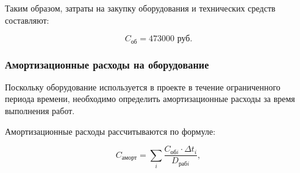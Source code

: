 \begin{table}[h]
\centering
\caption{Затраты на закупку оборудования и технических средств}
\label{tab:equipment}
\end{table}

Таким образом, затраты на закупку оборудования и технических средств
составляют:

\begin{equation}
C_{\text{об}} = 473000 \text{ руб.}
\end{equation}

\subsubsection*{Амортизационные расходы на оборудование}

Поскольку оборудование используется в проекте в течение ограниченного
периода времени, необходимо определить амортизационные расходы за
время выполнения работ.

Амортизационные расходы рассчитываются по формуле:

\begin{equation}
C_{\text{аморт}} =
\sum_i \frac{C_{\text{об}i} \cdot \Delta t_i}{D_{\text{раб}i}},
\end{equation}

